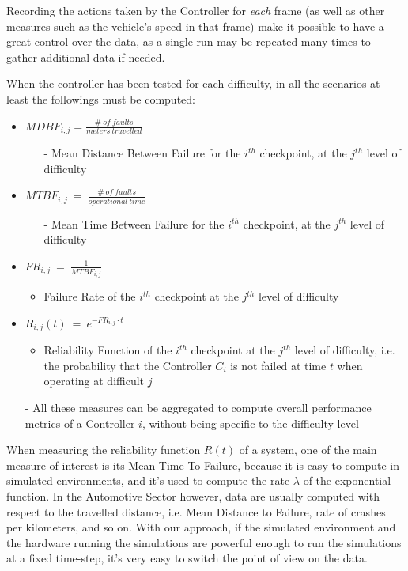 Recording the actions taken by the Controller for \textsl{each} frame (as well as other measures such as the vehicle's speed in that frame) make it possible to have a great control over the data, as a single run may be repeated many times to gather additional data if needed.

When the controller has been tested for each difficulty, in all the scenarios at least the followings must be computed:

\begin{itemize}
	\item $MDBF_{i,j} = \frac{\#\: of\: faults}{meters\: travelled}$
	\begin{itemize}
		\item[-] Mean Distance Between Failure for the $i^{th}$ checkpoint, at the $j^{th}$ level of difficulty
	\end{itemize}
	\item $MTBF_{i,j}\: =\: \frac{\#\: of\: faults}{operational\: time}$
		\begin{itemize}
		\item[-] Mean Time Between Failure for the $i^{th}$ checkpoint, at the $j^{th}$ level of difficulty
	\end{itemize}
	\item $FR_{i,j}\: =\: \frac{1}{MTBF_{i,j}}$
	\begin{itemize}
		\item Failure Rate of the $i^{th}$ checkpoint at the $j^{th}$ level of difficulty
	\end{itemize}
	\item $R_{i,j}(t)\: =\: e^{-FR_{i,j}\cdot t}$
	\begin{itemize}
		\item Reliability Function of the $i^{th}$ checkpoint at the $j^{th}$ level of difficulty, i.e. the probability that the Controller $C_{i}$ is not failed at time $t$ when operating at difficult $j$
	\end{itemize}
	
	\item[-] All these measures can be aggregated to compute overall performance metrics of a Controller $i$, without being specific to the difficulty level
	
\end{itemize}

When measuring the reliability function $R(t)$ of a system, one of the main measure of interest is its Mean Time To Failure, because it is easy to compute in simulated environments, and it's used to compute the rate $\lambda$ of the exponential function.
In the Automotive Sector however, data are usually computed with respect to the travelled distance, i.e. Mean Distance to Failure, rate of crashes per kilometers, and so on.
With our approach, if the simulated environment and the hardware running the simulations are powerful enough to run the simulations at a fixed time-step, it's very easy to switch the point of view on the data.

